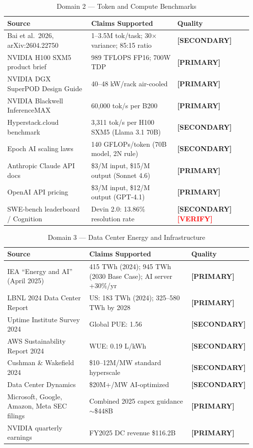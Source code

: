 \documentclass{article}
\newcommand{\PRIMARY}{\textbf{[PRIMARY]}}
\newcommand{\SECONDARY}{\textbf{[SECONDARY]}}
\newcommand{\VERIFY}{\textcolor{red}{\textbf{[VERIFY]}}}
\begin{document}
\begin{table}[ht]
\centering
\caption{Domain 2 --- Token and Compute Benchmarks}
\label{tab:domain2}
\small
\begin{tabular}{@{}p{4.5cm}p{3.5cm}p{1.5cm}@{}}
\toprule
\textbf{Source} & \textbf{Claims Supported} & \textbf{Quality} \\
\midrule
Bai et al.\ 2026, arXiv:2604.22750 & 1--3.5M tok/task; 30$\times$ variance; 85:15 ratio & \SECONDARY{} \\
NVIDIA H100 SXM5 product brief & 989 TFLOPS FP16; 700W TDP & \PRIMARY{} \\
NVIDIA DGX SuperPOD Design Guide & 40--48 kW/rack air-cooled & \PRIMARY{} \\
NVIDIA Blackwell InferenceMAX & 60,000 tok/s per B200 & \PRIMARY{} \\
Hyperstack.cloud benchmark & 3,311 tok/s per H100 SXM5 (Llama 3.1 70B) & \SECONDARY{} \\
Epoch AI scaling laws & 140 GFLOPs/token (70B model, 2N rule) & \SECONDARY{} \\
Anthropic Claude API docs & \$3/M input, \$15/M output (Sonnet 4.6) & \PRIMARY{} \\
OpenAI API pricing & \$3/M input, \$12/M output (GPT-4.1) & \PRIMARY{} \\
SWE-bench leaderboard / Cognition & Devin 2.0: 13.86\% resolution rate & \SECONDARY{} \VERIFY{} \\
\bottomrule
\end{tabular}
\end{table}

\begin{table}[ht]
\centering
\caption{Domain 3 --- Data Center Energy and Infrastructure}
\label{tab:domain3}
\small
\begin{tabular}{@{}p{4.5cm}p{3.5cm}p{1.5cm}@{}}
\toprule
\textbf{Source} & \textbf{Claims Supported} & \textbf{Quality} \\
\midrule
IEA ``Energy and AI'' (April 2025) & 415 TWh (2024); 945 TWh (2030 Base Case); AI server +30\%/yr & \PRIMARY{} \\
LBNL 2024 Data Center Report & US: 183 TWh (2024); 325--580 TWh by 2028 & \PRIMARY{} \\
Uptime Institute Survey 2024 & Global PUE: 1.56 & \SECONDARY{} \\
AWS Sustainability Report 2024 & WUE: 0.19 L/kWh & \SECONDARY{} \\
Cushman \& Wakefield 2024 & \$10--12M/MW standard hyperscale & \SECONDARY{} \\
Data Center Dynamics & \$20M+/MW AI-optimized & \SECONDARY{} \\
Microsoft, Google, Amazon, Meta SEC filings & Combined 2025 capex guidance $\sim$\$448B & \PRIMARY{} \\
NVIDIA quarterly earnings & FY2025 DC revenue \$116.2B & \PRIMARY{} \\
\bottomrule
\end{tabular}
\end{table}
\end{document}
